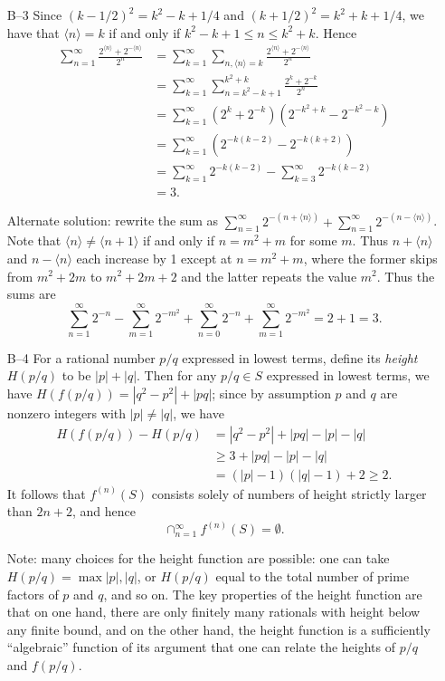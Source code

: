 \documentclass[amssymb,twocolumn,pra,10pt,aps]{revtex4-1}
\begin{document}
\begin{itemize}
\item[B--3]
Since $(k-1/2)^2 = k^2-k+1/4$ and $(k+1/2)^2 = k^2+k+1/4$,
we have that $\langle n \rangle = k$ if and only if
$k^2-k+1 \leq n \leq k^2+k$.  Hence
\begin{align*}
\sum_{n=1}^\infty \frac{2^{\langle n \rangle} + 2^{-\langle n \rangle}}{2^n}
&= \sum_{k=1}^\infty \sum_{n, \langle n \rangle = k}
    \frac{2^{\langle n \rangle} + 2^{-\langle n \rangle}}{2^n} \\
&= \sum_{k=1}^\infty \sum_{n=k^2-k+1}^{k^2+k} \frac{2^k+2^{-k}}{2^n} \\
&= \sum_{k=1}^\infty (2^k+2^{-k})(2^{-k^2+k}-2^{-k^2-k}) \\
&= \sum_{k=1}^\infty (2^{-k(k-2)} - 2^{-k(k+2)}) \\
&= \sum_{k=1}^\infty 2^{-k(k-2)} - \sum_{k=3}^\infty 2^{-k(k-2)} \\
&= 3.
\end{align*}

Alternate solution: rewrite the sum as $\sum_{n=1}^\infty
2^{-(n+\langle n \rangle)} + \sum_{n=1}^\infty
2^{-(n - \langle n \rangle)}$.
Note that $\langle n \rangle \neq \langle n+1 \rangle$
if and only if $n = m^2+m$ for some $m$. Thus $n + \langle n \rangle$
and $n - \langle n \rangle$ each increase by 1 except at $n=m^2+m$,
where the former skips from $m^2+2m$ to $m^2+2m+2$ and the latter
repeats the value $m^2$. Thus the sums are
\[
\sum_{n=1}^\infty 2^{-n} - \sum_{m=1}^\infty 2^{-m^2}
+ \sum_{n=0}^\infty 2^{-n} + \sum_{m=1}^\infty 2^{-m^2}
= 2+1=3.
\]

\item[B--4]
For a rational number $p/q$ expressed in lowest terms, define
its {\it height} $H(p/q)$ to be $|p|+|q|$.  Then for any $p/q\in S$
expressed in lowest terms, we have $H(f(p/q))=|q^2-p^2|+|pq|$; since
by assumption $p$ and $q$ are nonzero integers with $|p|\neq |q|$,
we have
\begin{align*}
H(f(p/q)) - H(p/q) &= |q^2-p^2|+|pq| -|p| -|q| \\
  &\geq 3+ |pq| -|p| - |q| \\
&= (|p|-1)(|q|-1) + 2 \geq 2 .
\end{align*}
It follows that $f^{(n)}(S)$ consists solely of numbers of height
strictly larger than $2n+2$, and hence
\[\cap_{n=1}^\infty f^{(n)}(S) = \emptyset.\]

Note: many choices for the height function are possible: one can
take $H(p/q) = \max{|p|, |q|}$, or $H(p/q)$ equal to the total number of
prime factors of $p$ and $q$, and so on. The key properties of the height
function are that on one hand, there are only finitely many rationals with
height below any finite bound, and on the other hand, the height function
is a sufficiently ``algebraic'' function of its argument that one can
relate the heights of $p/q$ and $f(p/q)$.


\end{itemize}
\end{document}
